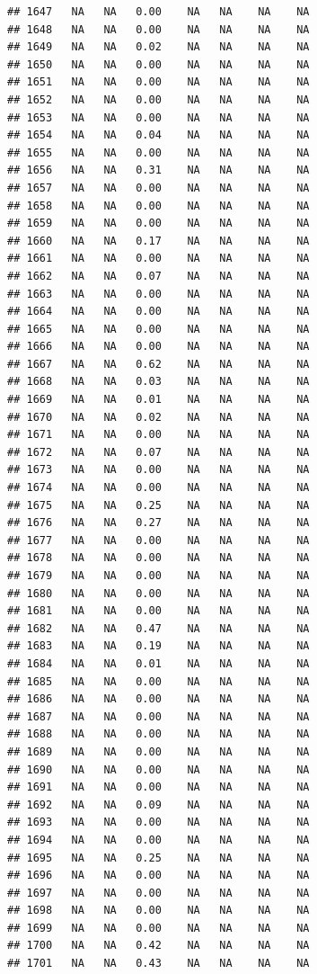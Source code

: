 \documentclass{article}\usepackage{graphicx, color}
\makeatletter
\newenvironment{kframe}{%
 \def\at@end@of@kframe{}%
 \ifinner\ifhmode%
  \def\at@end@of@kframe{\end{minipage}}%
  \begin{minipage}{\columnwidth}%
 \fi\fi%
 \def\FrameCommand##1{\hskip\@totalleftmargin \hskip-\fboxsep
 \colorbox{shadecolor}{##1}\hskip-\fboxsep
     \hskip-\linewidth \hskip-\@totalleftmargin \hskip\columnwidth}%
 \MakeFramed {\advance\hsize-\width
   \@totalleftmargin\z@ \linewidth\hsize
   \@setminipage}}%
 {\par\unskip\endMakeFramed%
 \at@end@of@kframe}
\newenvironment{knitrout}{}{} %
\makeatother
\begin{document}
\begin{knitrout}
\begin{kframe}
\begin{verbatim}
## 1647   NA   NA   0.00    NA   NA    NA    NA
## 1648   NA   NA   0.00    NA   NA    NA    NA
## 1649   NA   NA   0.02    NA   NA    NA    NA
## 1650   NA   NA   0.00    NA   NA    NA    NA
## 1651   NA   NA   0.00    NA   NA    NA    NA
## 1652   NA   NA   0.00    NA   NA    NA    NA
## 1653   NA   NA   0.00    NA   NA    NA    NA
## 1654   NA   NA   0.04    NA   NA    NA    NA
## 1655   NA   NA   0.00    NA   NA    NA    NA
## 1656   NA   NA   0.31    NA   NA    NA    NA
## 1657   NA   NA   0.00    NA   NA    NA    NA
## 1658   NA   NA   0.00    NA   NA    NA    NA
## 1659   NA   NA   0.00    NA   NA    NA    NA
## 1660   NA   NA   0.17    NA   NA    NA    NA
## 1661   NA   NA   0.00    NA   NA    NA    NA
## 1662   NA   NA   0.07    NA   NA    NA    NA
## 1663   NA   NA   0.00    NA   NA    NA    NA
## 1664   NA   NA   0.00    NA   NA    NA    NA
## 1665   NA   NA   0.00    NA   NA    NA    NA
## 1666   NA   NA   0.00    NA   NA    NA    NA
## 1667   NA   NA   0.62    NA   NA    NA    NA
## 1668   NA   NA   0.03    NA   NA    NA    NA
## 1669   NA   NA   0.01    NA   NA    NA    NA
## 1670   NA   NA   0.02    NA   NA    NA    NA
## 1671   NA   NA   0.00    NA   NA    NA    NA
## 1672   NA   NA   0.07    NA   NA    NA    NA
## 1673   NA   NA   0.00    NA   NA    NA    NA
## 1674   NA   NA   0.00    NA   NA    NA    NA
## 1675   NA   NA   0.25    NA   NA    NA    NA
## 1676   NA   NA   0.27    NA   NA    NA    NA
## 1677   NA   NA   0.00    NA   NA    NA    NA
## 1678   NA   NA   0.00    NA   NA    NA    NA
## 1679   NA   NA   0.00    NA   NA    NA    NA
## 1680   NA   NA   0.00    NA   NA    NA    NA
## 1681   NA   NA   0.00    NA   NA    NA    NA
## 1682   NA   NA   0.47    NA   NA    NA    NA
## 1683   NA   NA   0.19    NA   NA    NA    NA
## 1684   NA   NA   0.01    NA   NA    NA    NA
## 1685   NA   NA   0.00    NA   NA    NA    NA
## 1686   NA   NA   0.00    NA   NA    NA    NA
## 1687   NA   NA   0.00    NA   NA    NA    NA
## 1688   NA   NA   0.00    NA   NA    NA    NA
## 1689   NA   NA   0.00    NA   NA    NA    NA
## 1690   NA   NA   0.00    NA   NA    NA    NA
## 1691   NA   NA   0.00    NA   NA    NA    NA
## 1692   NA   NA   0.09    NA   NA    NA    NA
## 1693   NA   NA   0.00    NA   NA    NA    NA
## 1694   NA   NA   0.00    NA   NA    NA    NA
## 1695   NA   NA   0.25    NA   NA    NA    NA
## 1696   NA   NA   0.00    NA   NA    NA    NA
## 1697   NA   NA   0.00    NA   NA    NA    NA
## 1698   NA   NA   0.00    NA   NA    NA    NA
## 1699   NA   NA   0.00    NA   NA    NA    NA
## 1700   NA   NA   0.42    NA   NA    NA    NA
## 1701   NA   NA   0.43    NA   NA    NA    NA

\end{verbatim}
\end{kframe}
\end{knitrout}
\end{document}
